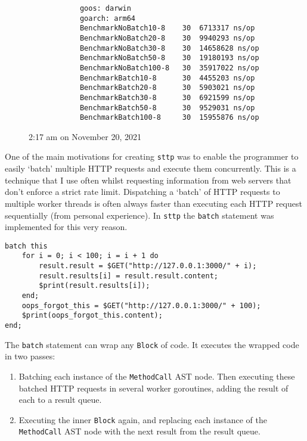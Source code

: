 \begin{figure}[H]
\begin{center}
\begin{verbatim}
            goos: darwin
            goarch: arm64
            BenchmarkNoBatch10-8    30  6713317 ns/op
            BenchmarkNoBatch20-8    30  9940293 ns/op
            BenchmarkNoBatch30-8    30  14658628 ns/op
            BenchmarkNoBatch50-8    30  19180193 ns/op 
            BenchmarkNoBatch100-8   30  35917022 ns/op
            BenchmarkBatch10-8      30  4455203 ns/op
            BenchmarkBatch20-8      30  5903021 ns/op
            BenchmarkBatch30-8      30  6921599 ns/op
            BenchmarkBatch50-8      30  9529031 ns/op
            BenchmarkBatch100-8     30  15955876 ns/op
        \end{verbatim}
        \tiny{2:17 am on November 20, 2021}
    \end{center}
\end{figure}

One of the main motivations for creating \verb|sttp| was to enable the programmer to easily `batch' multiple HTTP requests and execute them concurrently. This is a technique that I use often whilst requesting information from web servers that don't enforce a strict rate limit. Dispatching a `batch' of HTTP requests to multiple worker threads is often always faster than executing each HTTP request sequentially (from personal experience). In \verb|sttp| the \verb|batch| statement was implemented for this very reason.

\begin{verbatim}
batch this
    for i = 0; i < 100; i = i + 1 do
        result.result = $GET("http://127.0.0.1:3000/" + i);
        result.results[i] = result.result.content;
        $print(result.results[i]);
    end;
    oops_forgot_this = $GET("http://127.0.0.1:3000/" + 100);
    $print(oops_forgot_this.content);
end;
\end{verbatim}

The \verb|batch| statement can wrap any \verb|Block| of code. It executes the wrapped code in two passes:

\begin{enumerate}
    \item Batching each instance of the \verb|MethodCall| AST node. Then executing these batched HTTP requests in several worker goroutines, adding the result of each to a result queue.
    \item Executing the inner \verb|Block| again, and replacing each instance of the \verb|MethodCall| AST node with the next result from the result queue.
\end{enumerate}

